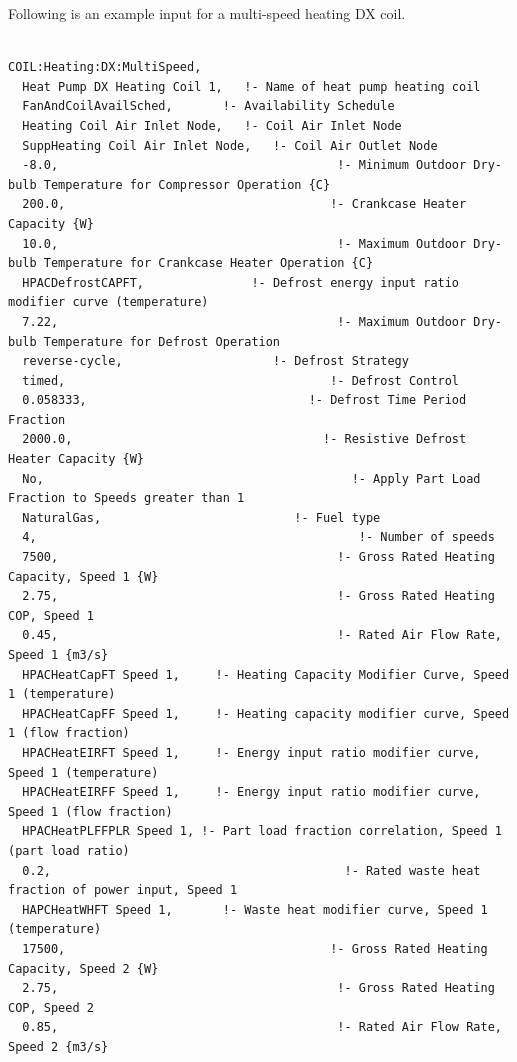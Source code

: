 Following is an example input for a multi-speed heating DX coil.

\begin{lstlisting}

COIL:Heating:DX:MultiSpeed,
  Heat Pump DX Heating Coil 1,   !- Name of heat pump heating coil
  FanAndCoilAvailSched,       !- Availability Schedule
  Heating Coil Air Inlet Node,   !- Coil Air Inlet Node
  SuppHeating Coil Air Inlet Node,   !- Coil Air Outlet Node
  -8.0,                                       !- Minimum Outdoor Dry-bulb Temperature for Compressor Operation {C}
  200.0,                                     !- Crankcase Heater Capacity {W}
  10.0,                                       !- Maximum Outdoor Dry-bulb Temperature for Crankcase Heater Operation {C}
  HPACDefrostCAPFT,               !- Defrost energy input ratio modifier curve (temperature)
  7.22,                                       !- Maximum Outdoor Dry-bulb Temperature for Defrost Operation
  reverse-cycle,                     !- Defrost Strategy
  timed,                                     !- Defrost Control
  0.058333,                               !- Defrost Time Period Fraction
  2000.0,                                   !- Resistive Defrost Heater Capacity {W}
  No,                                           !- Apply Part Load Fraction to Speeds greater than 1
  NaturalGas,                           !- Fuel type
  4,                                             !- Number of speeds
  7500,                                       !- Gross Rated Heating Capacity, Speed 1 {W}
  2.75,                                       !- Gross Rated Heating COP, Speed 1
  0.45,                                       !- Rated Air Flow Rate, Speed 1 {m3/s}
  HPACHeatCapFT Speed 1,     !- Heating Capacity Modifier Curve, Speed 1 (temperature)
  HPACHeatCapFF Speed 1,     !- Heating capacity modifier curve, Speed 1 (flow fraction)
  HPACHeatEIRFT Speed 1,     !- Energy input ratio modifier curve, Speed 1 (temperature)
  HPACHeatEIRFF Speed 1,     !- Energy input ratio modifier curve, Speed 1 (flow fraction)
  HPACHeatPLFFPLR Speed 1, !- Part load fraction correlation, Speed 1 (part load ratio)
  0.2,                                         !- Rated waste heat fraction of power input, Speed 1
  HAPCHeatWHFT Speed 1,       !- Waste heat modifier curve, Speed 1 (temperature)
  17500,                                     !- Gross Rated Heating Capacity, Speed 2 {W}
  2.75,                                       !- Gross Rated Heating COP, Speed 2
  0.85,                                       !- Rated Air Flow Rate, Speed 2 {m3/s}

\end{lstlisting}
